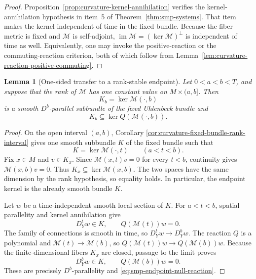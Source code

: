 \documentclass[10pt]{coll-l}
\newtheorem{lemma}[theorem]{Lemma}
\theoremstyle{definition}
\theoremstyle{remark}
\numberwithin{section}{chapter}
\numberwithin{equation}{chapter}
\begin{document}
\begin{proof}
Proposition~\ref{prop:curvature-kernel-annihilation} verifies the
kernel-annihilation hypothesis in item~5 of
Theorem~\ref{thm:smp-systems}.  That item makes the kernel independent of
time in the fixed bundle.  Because the fiber metric is fixed and
$\mathcal M$ is self-adjoint,
$\operatorname{im}\mathcal M=(\ker\mathcal M)^\perp$ is independent of time
as well.  Equivalently, one may invoke the positive-reaction or the
commuting-reaction criterion, both of which follow from
Lemma~\ref{lem:curvature-reaction-positive-commuting}.
\end{proof}

\begin{lemma}[One-sided transfer to a rank-stable endpoint]
\label{lem:curvature-one-sided-endpoint}
Let $0<a<b<T$, and suppose that the rank of $\mathcal M$ has one constant
value on $M\times(a,b]$.  Then
\[
                     K_b=\ker\mathcal M(\cdot,b)
\]
is a smooth $D^b$-parallel subbundle of the fixed Uhlenbeck bundle and
\begin{equation}
                     K_b\subseteq\ker Q(\mathcal M(\cdot,b)).
                                                        \label{eq:smp-endpoint-null-reaction}
\end{equation}
\end{lemma}

\begin{proof}
On the open interval $(a,b)$, Corollary
\ref{cor:curvature-fixed-bundle-rank-interval} gives one smooth subbundle
$K$ of the fixed bundle such that
\[
       K=\ker\mathcal M(\cdot,t)
       \qquad(a<t<b).
\]
Fix $x\in M$ and $v\in K_x$.  Since
$\mathcal M(x,t)v=0$ for every $t<b$, continuity gives
$\mathcal M(x,b)v=0$.  Thus
$K_x\subseteq\ker\mathcal M(x,b)$.  The two spaces have the same
dimension by the rank hypothesis, so equality holds.  In particular, the
endpoint kernel is the already smooth bundle $K$.

Let $w$ be a time-independent smooth local section of $K$.  For $a<t<b$,
spatial parallelity and kernel annihilation give
\[
              D_Y^tw\in K,
       \qquad Q(\mathcal M(t))w=0.
\]
The family of connections is smooth in time, so
$D_Y^tw\to D_Y^bw$.  The reaction $Q$ is a polynomial and
$\mathcal M(t)\to\mathcal M(b)$, so
$Q(\mathcal M(t))w\to Q(\mathcal M(b))w$.  Because the finite-dimensional
fibers $K_x$ are closed, passage to the limit proves
\[
              D_Y^bw\in K,
       \qquad Q(\mathcal M(b))w=0.
\]
These are precisely $D^b$-parallelity and
\eqref{eq:smp-endpoint-null-reaction}.
\end{proof}
\end{document}
